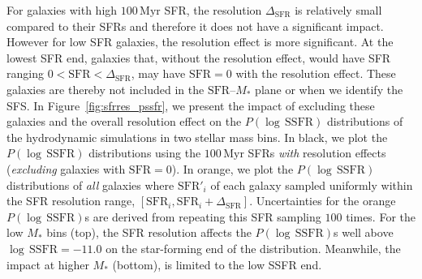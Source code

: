 \documentclass[tighten, preprint]{aastex62}
\begin{document}
For galaxies with high $100\,\mathrm{Myr}$ SFR, the resolution 
$\Delta_\mathrm{SFR}$ is relatively small compared to their SFRs and
therefore it does not have a significant impact. However for low SFR 
galaxies, the resolution effect is more significant. At the lowest SFR 
end, galaxies that, without the resolution effect, would have SFR ranging 
$0 < \mathrm{SFR} < \Delta_\mathrm{SFR}$, may have $\mathrm{SFR}{=}0$ with 
the resolution effect. These galaxies are thereby not included in the 
$\mathrm{SFR}$--$M_*$ plane or when we identify the SFS. In
Figure~\ref{fig:sfrres_pssfr}, we present the impact of excluding these
galaxies and the overall resolution effect on the $P(\log\,\mathrm{SSFR})$ 
distributions of the hydrodynamic simulations in two stellar mass bins. In 
black, we plot the $P(\log\,\mathrm{SSFR})$ distributions using the 
$100\,\mathrm{Myr}$ SFRs \emph{with} resolution effects
(\emph{excluding} galaxies with $\mathrm{SFR}{=}0$). In orange, we plot the 
$P(\log\,\mathrm{SSFR})$ distributions of \emph{all} galaxies where
$\mathrm{SFR}'_i$ of each galaxy sampled uniformly within the SFR resolution range, 
$[\mathrm{SFR}_i, \mathrm{SFR}_i+\Delta_\mathrm{SFR}]$. Uncertainties 
for the orange $P(\log\,\mathrm{SSFR})$s are derived from repeating this 
SFR sampling $100$ times. For the low $M_*$ bins (top), the SFR resolution 
affects the $P(\log\,\mathrm{SSFR})$s well above $\log\,\mathrm{SSFR}{=}-11.0$ 
on the star-forming end of the distribution. Meanwhile, the impact at higher
$M_*$ (bottom), is limited to the low SSFR end. 
\end{document}
